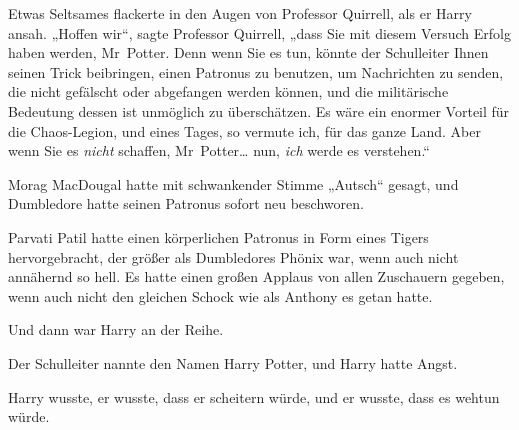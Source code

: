 Etwas Seltsames flackerte in den Augen von Professor Quirrell, als er Harry ansah. „Hoffen wir“, sagte Professor Quirrell, „dass Sie mit diesem Versuch Erfolg haben werden, Mr~Potter. Denn wenn Sie es tun, könnte der Schulleiter Ihnen seinen Trick beibringen, einen Patronus zu benutzen, um Nachrichten zu senden, die nicht gefälscht oder abgefangen werden können, und die militärische Bedeutung dessen ist unmöglich zu überschätzen. Es wäre ein enormer Vorteil für die Chaos-Legion, und eines Tages, so vermute ich, für das ganze Land. Aber wenn Sie es \emph{nicht} schaffen, Mr~Potter… nun, \emph{ich} werde es verstehen.“

\later

Morag MacDougal hatte mit schwankender Stimme „Autsch“ gesagt, und Dumbledore hatte seinen Patronus sofort neu beschworen.

Parvati Patil hatte einen körperlichen Patronus in Form eines Tigers hervorgebracht, der größer als Dumbledores Phönix war, wenn auch nicht annähernd so hell. Es hatte einen großen Applaus von allen Zuschauern gegeben, wenn auch nicht den gleichen Schock wie als Anthony es getan hatte.

Und dann war Harry an der Reihe.

Der Schulleiter nannte den Namen Harry Potter, und Harry hatte Angst.

Harry wusste, er wusste, dass er scheitern würde, und er wusste, dass es wehtun würde.

